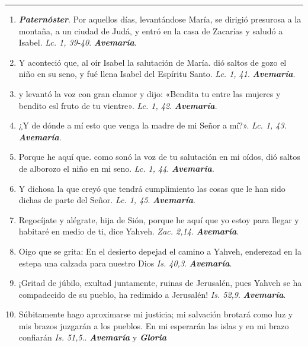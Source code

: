 \documentclass[11pt,a4paper]{book}
\begin{document}
    \rule{\textwidth}{0.5pt}

    \begin{enumerate}
        \item \textbf{\emph{Paternóster}}. Por aquellos días, levantándose María, se dirigió presurosa a la montaña, a un ciudad de Judá, y entró en la casa de Zacarías y saludó a Isabel. \emph{Lc. 1, 39-40}. \textbf{\emph{Avemaría}}.

        \item Y aconteció que, al oír Isabel la salutación de María. dió saltos de gozo el niño en su seno, y fué llena Isabel del Espíritu Santo. \emph{Lc. 1, 41}. \textbf{\emph{Avemaría}}.

        \item y levantó la voz con gran clamor y dijo: «Bendita tu entre las mujeres y bendito esl fruto de tu vientre». \emph{Lc. 1, 42}. \textbf{\emph{Avemaría}}.

        \item ¿Y de dónde a mí esto que venga la madre de mi Señor a mí?». \emph{Lc. 1, 43}. \textbf{\emph{Avemaría}}.

        \item Porque he aquí que. como sonó la voz de tu salutación en mi oídos, dió saltos de alborozo el niño en mi seno. \emph{Lc. 1, 44}. \textbf{\emph{Avemaría}}.

        \item Y dichosa la que creyó que tendrá cumplimiento las cosas que le han sido dichas de parte del Señor. \emph{Lc. 1, 45}. \textbf{\emph{Avemaría}}.

        \item Regocíjate y alégrate, hija de Sión, porque he aquí que yo estoy para llegar y habitaré en medio de ti, dice Yahveh. \emph{Zac. 2,14}. \textbf{\emph{Avemaría}}.

        \item Oigo que se grita: En el desierto depejad el camino a Yahveh, enderezad en la estepa una calzada para nuestro Dios \emph{Is. 40,3}. \textbf{\emph{Avemaría}}.

        \item ¡Gritad de júbilo, exultad juntamente, ruinas de Jerusalén, pues Yahveh se ha compadecido de su pueblo, ha redimido a Jerusalén! \emph{Is. 52,9}. \textbf{\emph{Avemaría}}.

        \item Súbitamente hago aproximarse mi justicia; mi salvación brotará como luz y mis brazos juzgarán a los pueblos. En mi esperarán las islas y en mi brazo confiarán \emph{Is. 51,5}.. \textbf{\emph{Avemaría}} y \textbf{\emph{Gloria}}
    \end{enumerate}    
\end{document}
